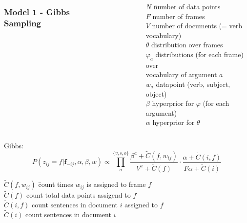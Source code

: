 \documentclass{beamer}
\begin{document}
\begin{frame}
  \begin{columns}
  \frametitle{Model 1 - Gibbs Sampling}
  \begin{figure}
  
  \end{figure}
  \begin{scriptsize}
  \begin{tabbing}
    $N$ \hspace{10pt}\= number of data points\\
    $F$              \> number of frames\\
    $V$              \> number of documents (= verb vocabulary)\\
    $\theta$         \> distribution over frames\\
    $\varphi_a$      \> distributions (for each frame) over \\ 
                     \> vocabulary of argument $a$\\
    $w_a$            \> datapoint (verb, subject, object)\\
    $\beta$          \> hyperprior for $\varphi$ (for each argument)\\
    $\alpha$         \> hyperprior for $\theta$ \\
  \end{tabbing}
  \end{scriptsize}
  \end{columns}
\footnotesize{Gibbs:}
\[
P(z_{ij} = f| \mathbf{f}_{-ij},\alpha,\beta,w)
\propto \prod_a^{\{v,s,o\}}\frac{\beta^a + \tilde{C}(f,w_{ij})}{V^a + \tilde{C}(f)}
        \cdot \frac{\alpha + \tilde{C}(i,f)}{F\alpha+\tilde{C}(i)}
\]
\begin{scriptsize}
  \begin{tabbing}
    $\tilde{C}(f,w_{ij})$ \hspace{10pt}\= count times $w_{ij}$ is assigned to frame $f$\\
    $\tilde{C}(f)$                     \> count total data points assigend to $f$\\
    $\tilde{C}(i,f)$                   \> count sentences in document $i$ assigned to $f$\\
    $\tilde{C}(i)$                     \> count sentences in document $i$\\ 
  \end{tabbing}
  \end{scriptsize}

\end{frame}
\end{document}
